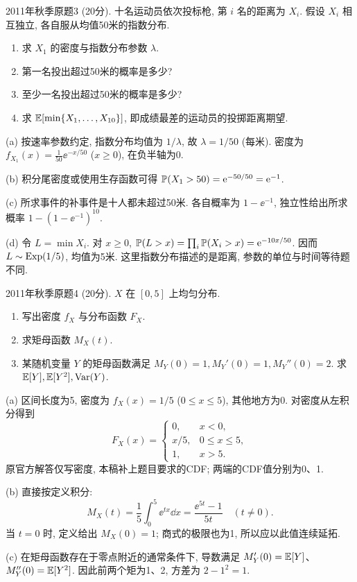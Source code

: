 \begin{exercise}\label{m2:2011f:q3}
2011年秋季原题3 (20分). 十名运动员依次投标枪, 第 $i$ 名的距离为 $X_i$. 假设 $X_i$ 相互独立, 各自服从均值50米的指数分布.
\begin{enumerate}
\item[(a)]\label{m2:2011f:q3:a} 求 $X_1$ 的密度与指数分布参数 $\lambda$.
\item[(b)]\label{m2:2011f:q3:b} 第一名投出超过50米的概率是多少?
\item[(c)]\label{m2:2011f:q3:c} 至少一名投出超过50米的概率是多少?
\item[(d)]\label{m2:2011f:q3:d} 求 $\mathbb E[\min\{X_1,\ldots,X_{10}\}]$, 即成绩最差的运动员的投掷距离期望.
\end{enumerate}
\end{exercise}
\begin{solution}
(a) 按速率参数约定, 指数分布均值为 $1/\lambda$, 故 $\lambda=1/50$ (每米). 密度为 $f_{X_1}(x)=\frac1{50}\ee^{-x/50}$ ($x\ge0$), 在负半轴为0.

(b) 积分尾密度或使用生存函数可得 $\mathbb P(X_1>50)=\mathrm e^{-50/50}=\mathrm e^{-1}$.

(c) 所求事件的补事件是十人都未超过50米. 各自概率为 $1-\ee^{-1}$, 独立性给出所求概率 $1-(1-\ee^{-1})^{10}$.

(d) 令 $L=\min X_i$. 对 $x\ge0$, $\mathbb P(L>x)=\prod_i\mathbb P(X_i>x)=\mathrm e^{-10x/50}$. 因而 $L\sim\operatorname{Exp}(1/5)$, 均值为5米. 这里指数分布描述的是距离, 参数的单位与时间等待题不同.
\end{solution}

\begin{exercise}\label{m2:2011f:q4}
2011年秋季原题4 (20分). $X$ 在 $[0,5]$ 上均匀分布.
\begin{enumerate}
\item[(a)]\label{m2:2011f:q4:a} 写出密度 $f_X$ 与分布函数 $F_X$.
\item[(b)]\label{m2:2011f:q4:b} 求矩母函数 $M_X(t)$.
\item[(c)]\label{m2:2011f:q4:c} 某随机变量 $Y$ 的矩母函数满足 $M_Y(0)=1,M_Y'(0)=1,M_Y''(0)=2$. 求 $\mathbb E[Y],\mathbb E[Y^2],\operatorname{Var}(Y)$.
\end{enumerate}
\end{exercise}
\begin{solution}
(a) 区间长度为5, 密度为 $f_X(x)=1/5$ ($0\le x\le5$), 其他地方为0. 对密度从左积分得到
\[
F_X(x)=\begin{cases}0,&x<0,\\x/5,&0\le x\le5,\\1,&x>5.\end{cases}
\]
原官方解答仅写密度, 本稿补上题目要求的CDF; 两端的CDF值分别为0、1.

(b) 直接按定义积分:
\[
M_X(t)=\frac15\int_0^5\ee^{tx}\dd x=\frac{\ee^{5t}-1}{5t}\quad(t\ne0).
\]
当 $t=0$ 时, 定义给出 $M_X(0)=1$; 商式的极限也为1, 所以应以此值连续延拓.

(c) 在矩母函数存在于零点附近的通常条件下, 导数满足 $M_Y'(0)=\mathbb E[Y]$、$M_Y''(0)=\mathbb E[Y^2]$. 因此前两个矩为1、2, 方差为 $2-1^2=1$.
\end{solution}

